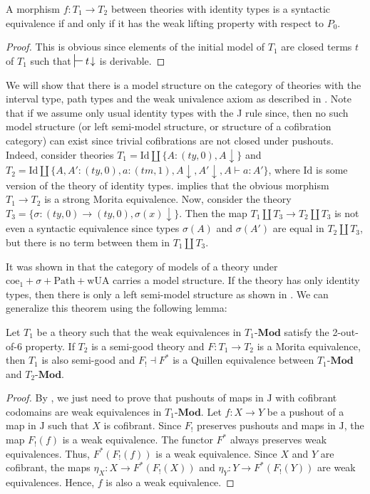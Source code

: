 \documentclass[reqno]{amsart}
\theoremstyle{definition}
\theoremstyle{remark}
\newcommand{\cat}[1]{\mathbf{#1}}
\newcommand{\Mod}[1]{#1\text{-}\cat{Mod}}
\newcommand{\IdT}{\mathrm{Id}}
\newcommand{\wUA}{\mathrm{wUA}}
\newcommand{\coeT}{\mathrm{coe}}
\newcommand{\PathT}{\mathrm{Path}}
\newcommand{\J}{\mathrm{J}}
\numberwithin{figure}{section}
\begin{document}
\begin{prop}
A morphism $f : T_1 \to T_2$ between theories with identity types is a syntactic equivalence if and only if it has the weak lifting property with respect to $P_0$.
\end{prop}
\begin{proof}
This is obvious since elements of the initial model of $T_1$ are closed terms $t$ of $T_1$ such that $\sststile{}{} t\!\downarrow$ is derivable.
\end{proof}

We will show that there is a model structure on the category of theories with the interval type, path types and the weak univalence axiom as described in \cite{alg-models}.
Note that if we assume only usual identity types with the J rule since, then no such model structure (or left semi-model structure, or structure of a cofibration category) can exist since trivial cofibrations are not closed under pushouts.
Indeed, consider theories $T_1 = \IdT \amalg \{ A : (ty,0), A\!\downarrow \}$ and $T_2 = \IdT \amalg \{ A, A' : (ty,0), a : (tm,1), A\!\downarrow, A'\!\downarrow, A \vdash a : A' \}$, where $\IdT$ is some version of the theory of identity types.
 implies that the obvious morphism $T_1 \to T_2$ is a strong Morita equivalence.
Now, consider the theory $T_3 = \{ \sigma : (ty,0) \to (ty,0), \sigma(x)\!\downarrow \}$.
Then the map $T_1 \amalg T_3 \to T_2 \amalg T_3$ is not even a syntactic equivalence since types $\sigma(A)$ and $\sigma(A')$ are equal in $T_2 \amalg T_3$, but there is no term between them in $T_1 \amalg T_3$.

It was shown in \cite{alg-models} that the category of models of a theory under $\coeT_1 + \sigma + \PathT + \wUA$ carries a model structure.
If the theory has only identity types, then there is only a left semi-model structure as shown in \cite{kap-lum-model}.
We can generalize this theorem using the following lemma:

\begin{lem}
Let $T_1$ be a theory such that the weak equivalences in $\Mod{T_1}$ satisfy the 2-out-of-6 property.
If $T_2$ is a semi-good theory and $F : T_1 \to T_2$ is a Morita equivalence, then $T_1$ is also semi-good and $F_! \dashv F^*$ is a Quillen equivalence between $\Mod{T_1}$ and $\Mod{T_2}$.
\end{lem}
\begin{proof}
By , we just need to prove that pushouts of maps in $\J$ with cofibrant codomains are weak equivalences in $\Mod{T_1}$.
Let $f : X \to Y$ be a pushout of a map in $\J$ such that $X$ is cofibrant.
Since $F_!$ preserves pushouts and maps in $\J$, the map $F_!(f)$ is a weak equivalence.
The functor $F^*$ always preserves weak equivalences.
Thus, $F^*(F_!(f))$ is a weak equivalence.
Since $X$ and $Y$ are cofibrant, the maps $\eta_X : X \to F^*(F_!(X))$ and $\eta_Y : Y \to F^*(F_!(Y))$ are weak equivalences.
Hence, $f$ is also a weak equivalence.
\end{proof}
\end{document}
